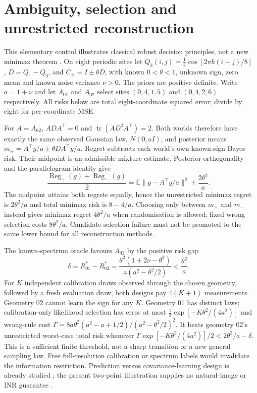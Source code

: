 \section{Ambiguity, selection and unrestricted reconstruction}\label{app:ambiguity}
This elementary control illustrates classical robust decision principles,
not a new minimax theorem \citep{kitagawa2011inference}.
On eight periodic sites let $Q_k(i,j)=\tfrac14\cos[2\pi k(i-j)/8]$,
$D=Q_1-Q_3$, and $C_\pm=I\pm\theta D$, with known $0<\theta<1$,
unknown sign, zero mean and known noise variance $\nu>0$.
The priors are positive definite. Write $a=1+\nu$ and let $A_{01}$ and
$A_{02}$ select sites $(0,4,1,5)$ and $(0,4,2,6)$ respectively.
All risks below are total eight-coordinate squared error; divide by eight
for per-coordinate MSE.

For $A=A_{02}$, $ADA^\top=0$ and $\operatorname{tr}(AD^2A^\top)=2$.
Both worlds therefore have exactly the same observed Gaussian law,
$N(0,aI)$, and posterior means $m_\pm=A^\top y/a\pm\theta DA^\top y/a$.
Regret subtracts each world's own known-sign Bayes risk.
Their midpoint is an admissible mixture estimate. Posterior orthogonality
and the parallelogram identity give
\[
\frac{\operatorname{Reg}_+(g)+\operatorname{Reg}_-(g)}2
=\mathbb E\|g-A^\top y/a\|^2+\frac{2\theta^2}{a}.
\]
The midpoint attains both regrets equally, hence the unrestricted minimax
regret is $2\theta^2/a$ and total minimax risk is $8-4/a$.
Choosing only between $m_+$ and $m_-$ instead gives minimax regret
$4\theta^2/a$ when randomisation is allowed; fixed wrong selection costs
$8\theta^2/a$. Candidate-selection failure must not be promoted to the
same lower bound for all reconstruction methods.

The known-spectrum oracle favours $A_{02}$ by the positive risk gap
\[
\delta=R^*_{01}-R^*_{02}
=\frac{\theta^2(1+2\nu-\theta^2)}{a(a^2-\theta^2/2)}
<\frac{\theta^2}{a}.
\]
For $K$ independent calibration draws observed through the chosen
geometry, followed by a fresh evaluation draw, both designs pay
$4(K+1)$ measurements. Geometry 02 cannot learn the sign for any $K$.
Geometry 01 has distinct laws; calibration-only likelihood selection
has error at most $\tfrac12\exp[-K\theta^2/(4a^2)]$ and wrong-rule cost
$\Gamma=8a\theta^2(a^2-a+1/2)/(a^2-\theta^2/2)^2$.
It beats geometry 02's unrestricted worst-case total risk whenever
$\Gamma\exp[-K\theta^2/(4a^2)]/2<2\theta^2/a-\delta$.
This is a sufficient finite threshold, not a sharp transition or a new
general sampling law. Free full-resolution calibration or spectrum
labels would invalidate the information restriction. Prediction versus
covariance-learning design is already studied \citep{zimmerman2006optimal};
the present two-point illustration supplies no natural-image or INR
guarantee .

